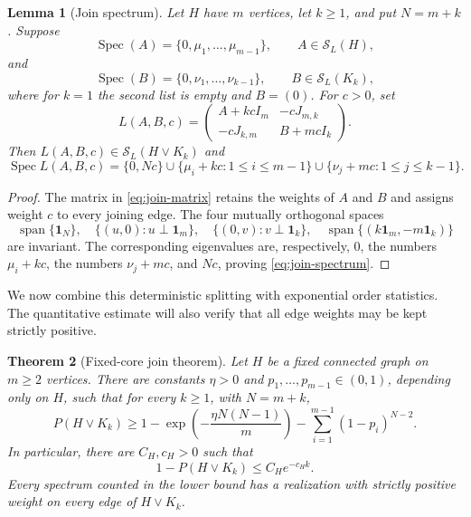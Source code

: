 \documentclass[11pt,reqno]{amsart}
\newtheorem{theorem}{Theorem}[section]
\newtheorem{lemma}[theorem]{Lemma}
\theoremstyle{definition}
\theoremstyle{remark}
\newcommand{\one}{\mathbf 1}
\newcommand{\SL}{\mathcal S_L}
\newcommand{\Spec}{\operatorname{Spec}}
\begin{document}
\begin{lemma}[Join spectrum]\label{lem:join-spectrum}
Let $H$ have $m$ vertices, let $k\ge1$, and put $N=m+k$.  Suppose
\[
  \Spec(A)=\{0,\mu_1,\ldots,\mu_{m-1}\},
  \qquad A\in\SL(H),
\]
and
\[
  \Spec(B)=\{0,\nu_1,\ldots,\nu_{k-1}\},
  \qquad B\in\SL(K_k),
\]
where for $k=1$ the second list is empty and $B=(0)$.  For $c>0$, set
\begin{equation}\label{eq:join-matrix}
  L(A,B,c)=
  \begin{pmatrix}
    A+kcI_m&-cJ_{m,k}\\
    -cJ_{k,m}&B+mcI_k
  \end{pmatrix}.
\end{equation}
Then $L(A,B,c)\in\SL(H\vee K_k)$ and
\begin{equation}\label{eq:join-spectrum}
  \Spec L(A,B,c)
  =
  \{0,Nc\}
  \cup\{\mu_i+kc:1\le i\le m-1\}
  \cup\{\nu_j+mc:1\le j\le k-1\}.
\end{equation}
\end{lemma}

\begin{proof}
The matrix in \eqref{eq:join-matrix} retains the weights of $A$ and $B$ and
assigns weight $c$ to every joining edge.  The four mutually orthogonal
spaces
\[
  \operatorname{span}\{\one_N\},\quad
  \{(u,0):u\perp\one_m\},\quad
  \{(0,v):v\perp\one_k\},\quad
  \operatorname{span}\{(k\one_m,-m\one_k)\}
\]
are invariant.  The corresponding eigenvalues are, respectively,
$0$, the numbers $\mu_i+kc$, the numbers $\nu_j+mc$, and $Nc$, proving
\eqref{eq:join-spectrum}.
\end{proof}

We now combine this deterministic splitting with exponential order
statistics.  The quantitative estimate will also verify that all edge
weights may be kept strictly positive.

\begin{theorem}[Fixed-core join theorem]\label{thm:fixed-core}
Let $H$ be a fixed connected graph on $m\ge2$ vertices.  There are constants
$\eta>0$ and $p_1,\ldots,p_{m-1}\in(0,1)$, depending only on $H$, such that
for every $k\ge1$, with $N=m+k$,
\begin{equation}\label{eq:fixed-core-explicit}
  P(H\vee K_k)
  \ge
  1-
  \exp\left(-\frac{\eta N(N-1)}{m}\right)
  -
  \sum_{i=1}^{m-1}(1-p_i)^{N-2}.
\end{equation}
In particular, there are $C_H,c_H>0$ such that
\begin{equation}\label{eq:fixed-core-rate}
  1-P(H\vee K_k)\le C_He^{-c_Hk}.
\end{equation}
Every spectrum counted in the lower bound has a realization with strictly
positive weight on every edge of $H\vee K_k$.
\end{theorem}
\end{document}
